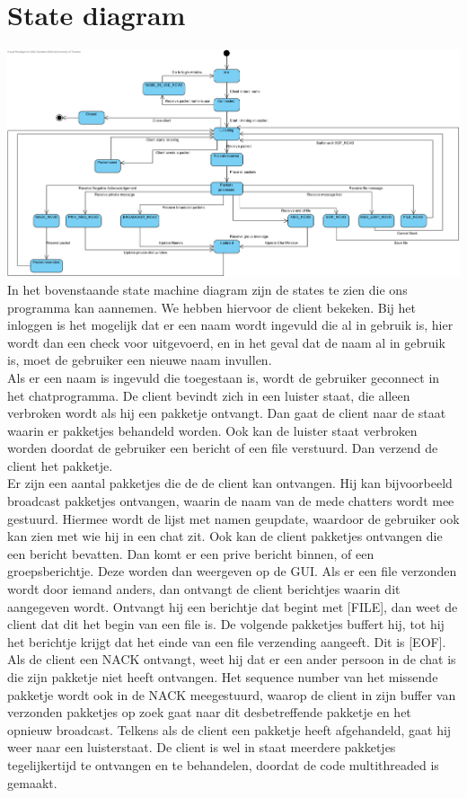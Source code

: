 \documentclass{article}
\begin{document}
\section{State diagram}
\includegraphics[angle=90, scale=0.6]{chatapplication.png}
\newpage
In het bovenstaande state machine diagram zijn de states te zien die ons programma kan aannemen. We hebben hiervoor de client bekeken. Bij het inloggen is het mogelijk dat er een naam wordt ingevuld die al in gebruik is, hier wordt dan een check voor uitgevoerd, en in het geval dat de naam al in gebruik is, moet de gebruiker een nieuwe naam invullen. \\
Als er een naam is ingevuld die toegestaan is, wordt de gebruiker geconnect in het chatprogramma. De client bevindt zich in een luister staat, die alleen verbroken wordt als hij een pakketje ontvangt. Dan gaat de client naar de staat waarin er pakketjes behandeld worden. Ook kan de luister staat verbroken worden doordat de gebruiker een bericht of een file verstuurd. Dan verzend de client het pakketje. \\
Er zijn een aantal pakketjes die de de client kan ontvangen. Hij kan bijvoorbeeld broadcast pakketjes ontvangen, waarin de naam van de mede chatters wordt mee gestuurd. Hiermee wordt de lijst met namen geupdate, waardoor de gebruiker ook kan zien met wie hij in een chat zit. Ook kan de client pakketjes ontvangen die een bericht bevatten. Dan komt er een prive bericht binnen, of een groepsberichtje. Deze worden dan weergeven op de GUI. Als er een file verzonden wordt door iemand anders, dan ontvangt de client berichtjes waarin dit aangegeven wordt. Ontvangt hij een berichtje dat begint met [FILE], dan weet de client dat dit het begin van een file is. De volgende pakketjes buffert hij, tot hij het berichtje krijgt dat het einde van een file verzending aangeeft. Dit is [EOF]. Als de client een NACK ontvangt, weet hij dat er een ander persoon in de chat is die zijn pakketje niet heeft ontvangen. Het sequence number van het missende pakketje wordt ook in de NACK meegestuurd, waarop de client in zijn buffer van verzonden pakketjes op zoek gaat naar dit desbetreffende pakketje en het opnieuw broadcast. Telkens als de client een pakketje heeft afgehandeld, gaat hij weer naar een luisterstaat. De client is wel in staat meerdere pakketjes tegelijkertijd te ontvangen en te behandelen, doordat de code multithreaded is gemaakt.
\end{document}
